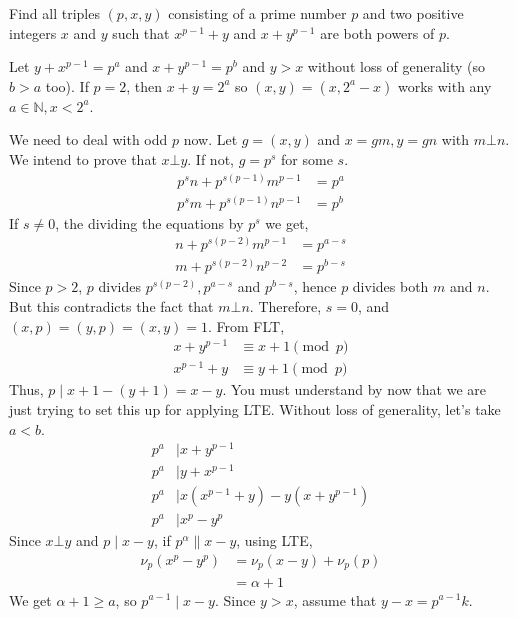 \documentclass[problems.tex]{subfile}
\begin{document}
	\begin{problem}
		Find all triples $(p,x,y)$ consisting of a prime number $p$ and two positive integers $x$ and $y$ such that $x^{p-1}+y$ and $x+y^{p-1}$ are both powers of $p$.
	\end{problem}

	\begin{solution}
		Let $y+x^{p-1}=p^a$ and $x+y^{p-1}=p^b$ and $y>x$ without loss of generality (so $b>a$ too). If $p=2$, then $x+y=2^a$ so $(x,y)=(x,2^a-x)$ works with any $a\in\mathbb{N},x<2^a$.

		We need to deal with odd $p$ now. Let $g=(x,y)$ and $x=gm,y=gn$ with $m\bot n$. We intend to prove that $x\bot y$. If not, $g=p^s$ for some $s$.
			\begin{align*}
				p^sn+p^{s(p-1)}m^{p-1} & = p^a\\
				p^sm+p^{s(p-1)}n^{p-1} & = p^b
			\end{align*}
		If $s\neq0$, the dividing the equations by $p^s$ we get,
			\begin{align*}
				n+p^{s(p-2)}m^{p-1} & = p^{a-s}\\
				m+p^{s(p-2)}n^{p-2} & = p^{b-s}
			\end{align*}
		Since $p>2$, $p$ divides $p^{s(p-2)},p^{a-s}$ and $p^{b-s}$, hence $p$ divides both $m$ and $n$. But this contradicts the fact that $m\bot n$. Therefore, $s=0$, and $(x,p)=(y,p)=(x,y)=1$. From FLT,
			\begin{align*}
				x+y^{p-1}&\equiv x+1\pmod p\\
				x^{p-1}+y&\equiv y+1\pmod p
			\end{align*}
		Thus, $p\mid x+1-(y+1)=x-y$. You must understand by now that we are just trying to set this up for applying LTE. Without loss of generality, let's take $a<b$.
			\begin{align*}
				p^a& \mid x+y^{p-1}\\
				p^a& \mid y+x^{p-1}\\
				p^a& \mid x(x^{p-1}+y)-y(x+y^{p-1})\\
				p^a& \mid x^p-y^p
			\end{align*}
		Since $x\bot y$ and $p\mid x-y$, if $p^\alpha \|x-y$, using LTE,
			\begin{align*}
				\nu_p(x^p-y^p)  & = \nu_p(x-y)+\nu_p(p)\\
								& = \alpha +1
			\end{align*}
		We get $\alpha +1\geq a$, so $p^{a-1}\mid x-y$. Since $y>x$, assume that $y-x=p^{a-1}k$.

\end{solution}
\end{document}
